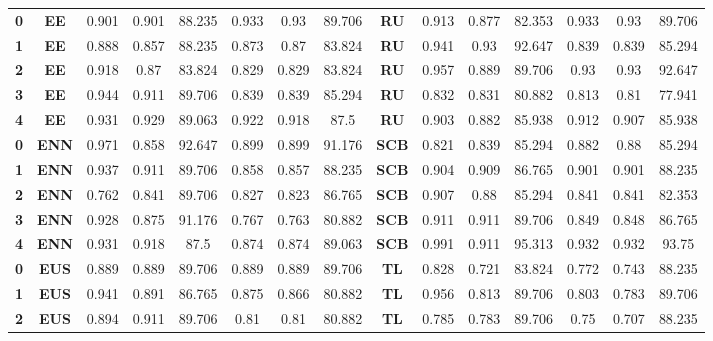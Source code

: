 {{\begin{tabular}{c|c|cccccc|ccccccc}
\textbf{0} & \textbf{EE} & 0.901 & 0.901 & 88.235 & 0.933 & 0.93  & 89.706 & \multicolumn{1}{c|}{\textbf{RU}} & 0.913 & 0.877 & 82.353 & 0.933 & 0.93  & 89.706 \\
\textbf{1} & \textbf{EE} & 0.888 & 0.857 & 88.235 & 0.873 & 0.87  & 83.824 & \multicolumn{1}{c|}{\textbf{RU}} & 0.941 & 0.93  & 92.647 & 0.839 & 0.839 & 85.294 \\
\textbf{2} & \textbf{EE} & 0.918 & 0.87  & 83.824 & 0.829 & 0.829 & 83.824 & \multicolumn{1}{c|}{\textbf{RU}} & 0.957 & 0.889 & 89.706 & 0.93  & 0.93  & 92.647 \\
\textbf{3} & \textbf{EE} & 0.944 & 0.911 & 89.706 & 0.839 & 0.839 & 85.294 & \multicolumn{1}{c|}{\textbf{RU}} & 0.832 & 0.831 & 80.882 & 0.813 & 0.81  & 77.941 \\
\textbf{4} & \textbf{EE} & 0.931 & 0.929 & 89.063 & 0.922 & 0.918 & 87.5  & \multicolumn{1}{c|}{\textbf{RU}} & 0.903 & 0.882 & 85.938 & 0.912 & 0.907 & 85.938 \\
\textbf{0} & \textbf{ENN} & 0.971 & 0.858 & 92.647 & 0.899 & 0.899 & 91.176 & \multicolumn{1}{c|}{\textbf{SCB}} & 0.821 & 0.839 & 85.294 & 0.882 & 0.88  & 85.294 \\
\textbf{1} & \textbf{ENN} & 0.937 & 0.911 & 89.706 & 0.858 & 0.857 & 88.235 & \multicolumn{1}{c|}{\textbf{SCB}} & 0.904 & 0.909 & 86.765 & 0.901 & 0.901 & 88.235 \\
\textbf{2} & \textbf{ENN} & 0.762 & 0.841 & 89.706 & 0.827 & 0.823 & 86.765 & \multicolumn{1}{c|}{\textbf{SCB}} & 0.907 & 0.88  & 85.294 & 0.841 & 0.841 & 82.353 \\
\textbf{3} & \textbf{ENN} & 0.928 & 0.875 & 91.176 & 0.767 & 0.763 & 80.882 & \multicolumn{1}{c|}{\textbf{SCB}} & 0.911 & 0.911 & 89.706 & 0.849 & 0.848 & 86.765 \\
\textbf{4} & \textbf{ENN} & 0.931 & 0.918 & 87.5  & 0.874 & 0.874 & 89.063 & \multicolumn{1}{c|}{\textbf{SCB}} & 0.991 & 0.911 & 95.313 & 0.932 & 0.932 & 93.75 \\
\textbf{0} & \textbf{EUS} & 0.889 & 0.889 & 89.706 & 0.889 & 0.889 & 89.706 & \multicolumn{1}{c|}{\textbf{TL}} & 0.828 & 0.721 & 83.824 & 0.772 & 0.743 & 88.235 \\
\textbf{1} & \textbf{EUS} & 0.941 & 0.891 & 86.765 & 0.875 & 0.866 & 80.882 & \multicolumn{1}{c|}{\textbf{TL}} & 0.956 & 0.813 & 89.706 & 0.803 & 0.783 & 89.706 \\
\textbf{2} & \textbf{EUS} & 0.894 & 0.911 & 89.706 & 0.81  & 0.81  & 80.882 & \multicolumn{1}{c|}{\textbf{TL}} & 0.785 & 0.783 & 89.706 & 0.75  & 0.707 & 88.235 \\

\end{tabular}}}
